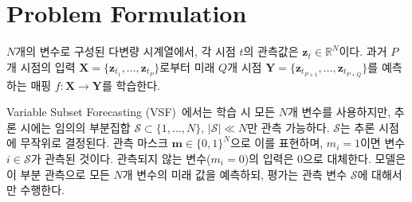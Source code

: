 
\section{Problem Formulation}

$N$개의 변수로 구성된 다변량 시계열에서, 각 시점 $t$의 관측값은 $\mathbf{z}_t \in \mathbb{R}^N$이다. 과거 $P$개 시점의 입력 $\mathbf{X} = \{\mathbf{z}_{t_1}, \ldots, \mathbf{z}_{t_P}\}$로부터 미래 $Q$개 시점 $\mathbf{Y} = \{\mathbf{z}_{t_{P+1}}, \ldots, \mathbf{z}_{t_{P+Q}}\}$를 예측하는 매핑 $f: \mathbf{X} \rightarrow \mathbf{Y}$를 학습한다.

Variable Subset Forecasting (VSF)~\cite{chauhan2022vsf}에서는 학습 시 모든 $N$개 변수를 사용하지만, 추론 시에는 임의의 부분집합 $\mathcal{S} \subset \{1, \ldots, N\}$, $|\mathcal{S}| \ll N$만 관측 가능하다. $\mathcal{S}$는 추론 시점에 무작위로 결정된다. 관측 마스크 $\mathbf{m} \in \{0, 1\}^N$으로 이를 표현하며, $m_i = 1$이면 변수 $i \in \mathcal{S}$가 관측된 것이다. 관측되지 않는 변수($m_i = 0$)의 입력은 0으로 대체한다. 모델은 이 부분 관측으로 모든 $N$개 변수의 미래 값을 예측하되, 평가는 관측 변수 $\mathcal{S}$에 대해서만 수행한다.
